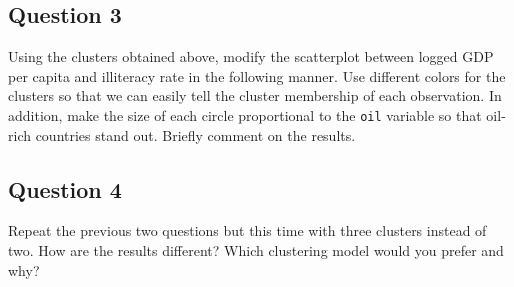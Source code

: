 \documentclass[]{article}
\begin{document}
\subsection{Question 3}\label{question-3}

Using the clusters obtained above, modify the scatterplot between logged
GDP per capita and illiteracy rate in the following manner. Use
different colors for the clusters so that we can easily tell the cluster
membership of each observation. In addition, make the size of each
circle proportional to the \texttt{oil} variable so that oil-rich
countries stand out. Briefly comment on the results.

\subsection{Question 4}\label{question-4}

Repeat the previous two questions but this time with three clusters
instead of two. How are the results different? Which clustering model
would you prefer and why?
\end{document}
